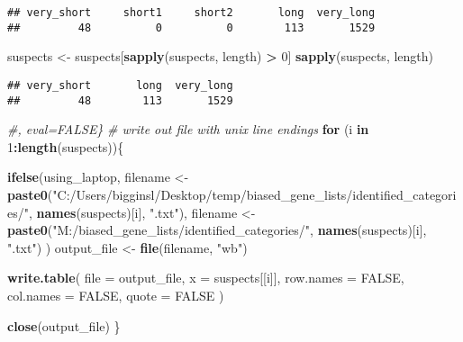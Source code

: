 \documentclass[]{article}
\newenvironment{Shaded}{\begin{snugshade}}{\end{snugshade}}
\newcommand{\KeywordTok}[1]{\textcolor[rgb]{0.13,0.29,0.53}{\textbf{#1}}}
\newcommand{\DataTypeTok}[1]{\textcolor[rgb]{0.13,0.29,0.53}{#1}}
\newcommand{\DecValTok}[1]{\textcolor[rgb]{0.00,0.00,0.81}{#1}}
\newcommand{\StringTok}[1]{\textcolor[rgb]{0.31,0.60,0.02}{#1}}
\newcommand{\CommentTok}[1]{\textcolor[rgb]{0.56,0.35,0.01}{\textit{#1}}}
\newcommand{\OtherTok}[1]{\textcolor[rgb]{0.56,0.35,0.01}{#1}}
\newcommand{\ControlFlowTok}[1]{\textcolor[rgb]{0.13,0.29,0.53}{\textbf{#1}}}
\newcommand{\OperatorTok}[1]{\textcolor[rgb]{0.81,0.36,0.00}{\textbf{#1}}}
\newcommand{\NormalTok}[1]{#1}
\begin{document}
\begin{verbatim}
## very_short     short1     short2       long  very_long 
##         48          0          0        113       1529
\end{verbatim}

\begin{Shaded}
\begin{Highlighting}[]
\NormalTok{suspects <-}\StringTok{ }\NormalTok{suspects[}\KeywordTok{sapply}\NormalTok{(suspects, length) }\OperatorTok{>}\StringTok{ }\DecValTok{0}\NormalTok{]}
\KeywordTok{sapply}\NormalTok{(suspects, length)}
\end{Highlighting}
\end{Shaded}

\begin{verbatim}
## very_short       long  very_long 
##         48        113       1529
\end{verbatim}

\begin{Shaded}
\begin{Highlighting}[]
\CommentTok{#, eval=FALSE\}}
\CommentTok{# write out file with unix line endings}
\ControlFlowTok{for}\NormalTok{ (i }\ControlFlowTok{in} \DecValTok{1}\OperatorTok{:}\KeywordTok{length}\NormalTok{(suspects))\{}
  
  \KeywordTok{ifelse}\NormalTok{(using_laptop,}
\NormalTok{         filename <-}\StringTok{ }\KeywordTok{paste0}\NormalTok{(}\StringTok{"C:/Users/bigginsl/Desktop/temp/biased_gene_lists/identified_categories/"}\NormalTok{, }\KeywordTok{names}\NormalTok{(suspects)[i], }\StringTok{".txt"}\NormalTok{),}
\NormalTok{         filename <-}\StringTok{ }\KeywordTok{paste0}\NormalTok{(}\StringTok{"M:/biased_gene_lists/identified_categories/"}\NormalTok{, }\KeywordTok{names}\NormalTok{(suspects)[i], }\StringTok{".txt"}\NormalTok{)}
\NormalTok{  )}
\NormalTok{  output_file <-}\StringTok{ }\KeywordTok{file}\NormalTok{(filename, }\StringTok{"wb"}\NormalTok{)}
  
  \KeywordTok{write.table}\NormalTok{(}
    \DataTypeTok{file      =}\NormalTok{ output_file,}
    \DataTypeTok{x         =}\NormalTok{ suspects[[i]], }
    \DataTypeTok{row.names =} \OtherTok{FALSE}\NormalTok{,}
    \DataTypeTok{col.names =} \OtherTok{FALSE}\NormalTok{, }
    \DataTypeTok{quote     =} \OtherTok{FALSE}
\NormalTok{  )}
  
  \KeywordTok{close}\NormalTok{(output_file)}
\NormalTok{\}}
\end{Highlighting}
\end{Shaded}
\end{document}
